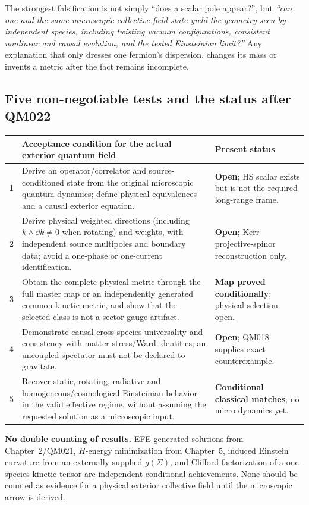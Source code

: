 \documentclass[11pt,a4paper]{article}
\begin{document}
The strongest falsification is not simply ``does a scalar pole appear?'', but \emph{``can one and the same microscopic collective field state yield the geometry seen by independent species, including twisting vacuum configurations, consistent nonlinear and causal evolution, and the tested Einsteinian limit?''} Any explanation that only dresses one fermion's dispersion, changes its mass or invents a metric after the fact remains incomplete.

\subsection{Five non-negotiable tests and the status after QM022}
\label{sec:v13-acceptance}
{\small
\begin{tabularx}{\linewidth}{@{}p{.055\linewidth}X p{.24\linewidth}@{}}\toprule
& Acceptance condition for the actual exterior quantum field & Present status\\\midrule
\textbf{1}& Derive an operator/correlator and source-conditioned state from the original microscopic quantum dynamics; define physical equivalences and a causal exterior equation. & \textbf{Open}; HS scalar exists but is not the required long-range frame.\\
\textbf{2}& Derive physical weighted directions (including $k\wedge\dd k\ne0$ when rotating) and weights, with independent source multipoles and boundary data; avoid a one-phase or one-current identification. & \textbf{Open}; Kerr projective-spinor reconstruction only.\\
\textbf{3}& Obtain the complete physical metric through the full master map or an independently generated common kinetic metric, and show that the selected class is not a sector-gauge artifact. & \textbf{Map proved conditionally}; physical selection open.\\
\textbf{4}& Demonstrate causal cross-species universality and consistency with matter stress/Ward identities; an uncoupled spectator must not be declared to gravitate. & \textbf{Open}; QM018 supplies exact counterexample.\\
\textbf{5}& Recover static, rotating, radiative and homogeneous/cosmological Einsteinian behavior in the valid effective regime, without assuming the requested solution as a microscopic input. & \textbf{Conditional classical matches}; no micro dynamics yet.\\\bottomrule
\end{tabularx}}

\textbf{No double counting of results.} EFE-generated solutions from Chapter~2/QM021, $H$-energy minimization from Chapter~5, induced Einstein curvature from an externally supplied $g(\Sigma)$, and Clifford factorization of a one-species kinetic tensor are independent conditional achievements. None should be counted as evidence for a physical exterior collective field until the microscopic arrow is derived.
\end{document}
